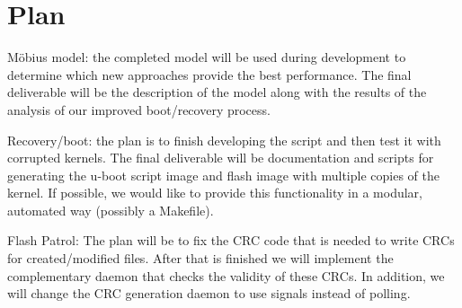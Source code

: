 \section{Plan}

M\"obius model: the completed model will be used during development to determine which new approaches provide the best performance.  The final deliverable will be the description of the model along with the results of the analysis of our improved boot/recovery process.

Recovery/boot: the plan is to finish developing the script and then test it with
corrupted kernels.  The final deliverable will be documentation and scripts for
generating the u-boot script image and flash image with multiple copies of the
kernel.  If possible, we would like to provide this functionality in a modular,
automated way (possibly a Makefile).

Flash Patrol: The plan will be to fix the CRC code that is needed to write
CRCs for created/modified files. After that is finished we will implement the 
complementary daemon that checks the validity of these CRCs. In addition, 
we will change the CRC generation daemon to use signals instead of polling.

